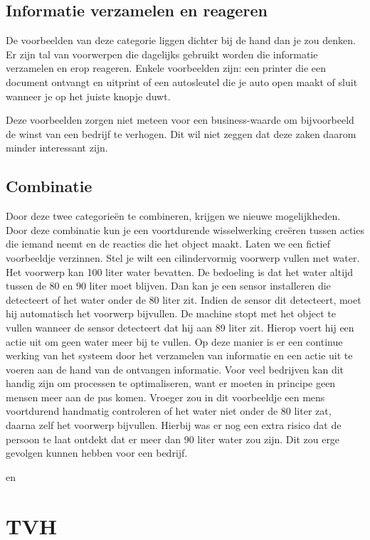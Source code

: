 \subsection{Informatie verzamelen en reageren}
De voorbeelden van deze categorie liggen dichter bij de hand dan je zou denken. Er zijn tal van voorwerpen die dagelijks gebruikt worden die informatie verzamelen en erop reageren. Enkele voorbeelden zijn: een printer die een document ontvangt en uitprint of een autosleutel die je auto open maakt of sluit wanneer je op het juiste knopje duwt.

Deze voorbeelden zorgen niet meteen voor een business-waarde om bijvoorbeeld de winst van een bedrijf te verhogen. Dit wil niet zeggen dat deze zaken daarom minder interessant zijn.

\subsection{Combinatie}
Door deze twee categorieën te combineren, krijgen we nieuwe mogelijkheden. Door deze combinatie kun je een voortdurende wisselwerking creëren tussen acties die iemand neemt en de reacties die het object maakt. Laten we een fictief voorbeeldje verzinnen. Stel je wilt een cilindervormig voorwerp vullen met water. Het voorwerp kan 100 liter water bevatten. De bedoeling is dat het water altijd tussen de 80 en 90 liter moet blijven. Dan kan je een sensor installeren die detecteert of het water onder de 80 liter zit. Indien de sensor dit detecteert, moet hij automatisch het voorwerp bijvullen. De machine stopt met het object te vullen wanneer de sensor detecteert dat hij aan 89 liter zit. Hierop voert hij een actie uit om geen water meer bij te vullen. Op deze manier is er een continue werking van het systeem door het verzamelen van informatie en een actie uit te voeren aan de hand van de ontvangen informatie. Voor veel bedrijven kan dit handig zijn om processen te optimaliseren, want er moeten in principe geen mensen meer aan de pas komen. Vroeger zou in dit voorbeeldje een mens voortdurend handmatig controleren of het water niet onder de 80 liter zat, daarna zelf het voorwerp bijvullen. Hierbij was er nog een extra risico dat de persoon te laat ontdekt dat er meer dan 90 liter water zou zijn. Dit zou erge gevolgen kunnen hebben voor een bedrijf.

\autocite{McClelland2019} en \autocite{i-scoop2019}

\section{TVH}

